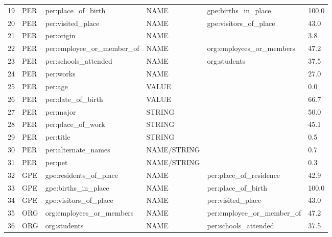 \documentclass[11pt,a4paper]{article}
\begin{document}
\begin{table*}[ht!]
\begin{tabular}{llllll}
19 & PER  & per:place\_of\_birth                  & NAME     &  gpe:births\_in\_place      & 100.0 \\
20 & PER  & per:visited\_place                   & NAME     &   gpe:visitors\_of\_place                   & 43.0 \\
21 & PER  & per:origin                   & NAME     &                                             & 3.8  \\    
22 & PER  & per:employee\_or\_member\_of & NAME     & org:employees\_or\_members                  & 47.2 \\
23 & PER  & per:schools\_attended        & NAME     &   org:students                              & 37.5 \\
24 & PER  & per:works                            & NAME     &                                             & 27.0 \\
25 & PER  & per:age                      & VALUE    &                                             & 0.0  \\
26 & PER  & per:date\_of\_birth          & VALUE    &                                             & 66.7 \\
27 & PER  & per:major                            & STRING   &                                             & 50.0 \\
28 & PER  & per:place\_of\_work                  & STRING   &                                             & 45.1 \\ 29 & PER  & per:title                    & STRING   &                                             & 0.5  \\
30 & PER  & per:alternate\_names         & NAME/STRING     &                                      & 0.7  \\
31 & PER  & per:pet                              & NAME/STRING     &                                      & 0.3  \\
32 & GPE  & gpe:residents\_of\_place & NAME     &   per:place\_of\_residence               & 42.9 \\
33 & GPE  & gpe:births\_in\_place    & NAME     &   per:place\_of\_birth                   & 100.0 \\
34 & GPE  & gpe:visitors\_of\_place       & NAME     &   per:visited\_place                               & 43.0   \\
35 & ORG  & org:employees\_or\_members     & NAME     &   per:employee\_or\_member\_of                    & 47.2\\
36 & ORG  & org:students          & NAME          &   per:schools\_attended                       & 37.5\\

\end{tabular}
\end{table*}
\end{document}
